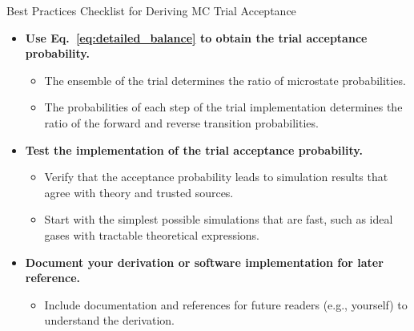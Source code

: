 \begin{Checklists*}[p!]
\begin{checklist}{Best Practices Checklist for Deriving MC Trial Acceptance}
\begin{itemize}
\item
  \textbf{Use Eq.~\ref{eq:detailed_balance} to obtain the trial acceptance probability.}
  \begin{itemize}
    \item The ensemble of the trial determines the ratio of microstate probabilities.
    \item The probabilities of each step of the trial implementation determines the ratio of the forward and reverse transition probabilities.
  \end{itemize}

\item
  \textbf{Test the implementation of the trial acceptance probability.}
  \begin{itemize}
    \item Verify that the acceptance probability leads to simulation results that agree with theory and trusted sources.
    \item Start with the simplest possible simulations that are fast, such as ideal gases with tractable theoretical expressions.
  \end{itemize}

\item
  \textbf{Document your derivation or software implementation for later reference.}
  \begin{itemize}
    \item Include documentation and references for future readers (e.g., yourself) to understand the derivation.
  \end{itemize}

\end{itemize}
\end{checklist}
\end{Checklists*}
